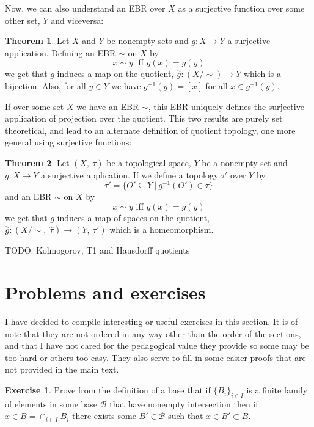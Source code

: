 \documentclass[a4paper]{book}
\theoremstyle{definition}
\newtheorem{theorem}{Theorem}[section]
\theoremstyle{ejemplo}
\newtheorem{exercise}{Exercise}[chapter]
\theoremstyle{demostracion}
\newcommand{\quottop}{\stackrel{\sim}{\tau}}
\begin{document}
Now, we can also understand an EBR over $X$ as a surjective function over some other set, $Y$ and viceversa:

\begin{theorem}
	Let $X$ and $Y$ be nonempty sets and $g: X \rightarrow Y$ a surjective application. Defining an EBR $\sim$ on $X$ by
	\begin{equation*}
		x \sim y \text{ iff } g(x) = g(y)
	\end{equation*}
	we get that $g$ induces a map on the quotient, $\stackrel{\sim}{g} : (X/\sim) \rightarrow Y$ which is a bijection. Also, for all $y \in Y$ we have $g^{-1}(y) = [x]$ for all $x \in g^{-1}(y)$.
\end{theorem}

If over some set $X$ we have an EBR $\sim$, this EBR uniquely defines the surjective application of projection over the quotient. This two results are purely set theoretical, and lead to an alternate definition of quotient topology, one more general using surjective functions:

\begin{theorem}
	Let $(X,\ \tau)$ be a topological space, $Y$ be a nonempty set and $g: X \rightarrow Y$ a surjective application. If we define a topology $\tau'$ over $Y$ by 
	\begin{equation*}
		\tau' = \{ O' \subseteq Y\ |\ g^{-1}(O') \in \tau\}
	\end{equation*}
	and an EBR $\sim$ on $X$ by
	\begin{equation*}
		x \sim y \text{ iff } g(x) = g(y)
	\end{equation*}
	we get that $g$ induces a map of spaces on the quotient, $\stackrel{\sim}{g} : (X/\sim,\ \quottop) \rightarrow (Y,\ \tau')$ which is a homeomorphism.
\end{theorem}

TODO: Kolmogorov, T1 and Hausdorff quotients

\section{Problems and exercises}
I have decided to compile interesting or useful exercises in this section. It is of note that they are not ordered in any way other than the order of the sections, and that I have not cared for the pedagogical value they provide so some may be too hard or others too easy. They also serve to fill in some easier proofs that are not provided in the main text.

\begin{exercise}\label{exer_bases}
	Prove from the definition of a base that if $\{ B_i \}_{i \in I}$ is a finite family of elements in some base $\mathcal{B}$ that have nonempty intersection then if $x \in B = \cap_{i \in I} B_i$ there exists some $B' \in \mathcal{B}$ such that $x \in B' \subset B$.
\end{exercise}
\end{document}
